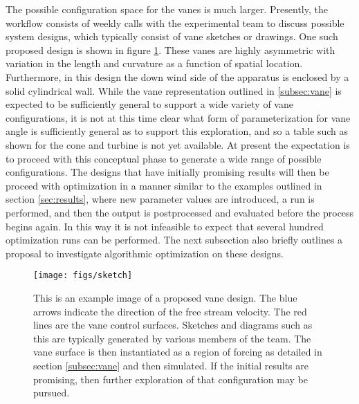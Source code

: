 The possible configuration space for the vanes is much larger. 
Presently, the workflow consists of weekly calls with the experimental
team to discuss possible system designs, which typically consist of vane
sketches or drawings. One such proposed design is shown in figure
\ref{fig:sketch}.  These vanes are highly asymmetric with variation in
the length and curvature as a function of spatial location. Furthermore,
in this design the down wind side of the apparatus is enclosed by a
solid cylindrical wall.  While the vane representation outlined in
\ref{subsec:vane} is expected to be  sufficiently general to support a
wide variety of vane configurations, it is not at this time clear what
form of parameterization for vane angle is sufficiently general as to
support this exploration, and so a table such as shown for the cone and
turbine is not yet available. At present the expectation is to proceed
with this conceptual phase to generate a wide  range of possible
configurations. The designs that have initially promising results will
then be proceed with optimization in a manner similar to the examples
outlined in section \ref{sec:results}, where new parameter values are
introduced, a run is performed, and then the output is postprocessed and
evaluated before the process begins again. In this way it is not
infeasible to expect that several hundred optimization runs can be
performed. The next subsection also briefly outlines a proposal to
investigate algorithmic optimization on these designs.  

\begin{figure}[htb]
 \centering
 \texttt{[image: figs/sketch]}
 \caption{This is an example image of a proposed vane design. The blue
 arrows indicate the direction of the free stream velocity. The red
 lines are the vane control surfaces. Sketches and diagrams such as this
 are typically generated by various members of the team. The vane
 surface is then instantiated as a region of forcing as detailed in
 section \ref{subsec:vane} and then simulated. If the initial results
 are promising, then further exploration of that configuration may be
 pursued.} 
 \label{fig:sketch}
\end{figure}




